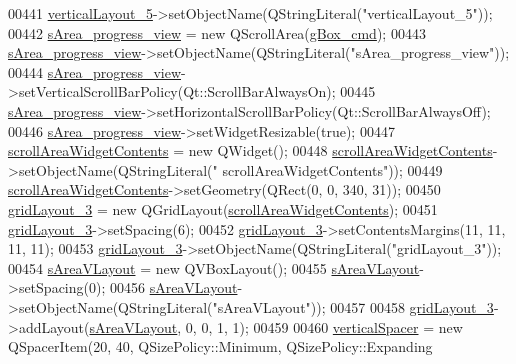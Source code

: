 \begin{DoxyCode}
00441         \hyperlink{a00080_afcc20a3d5058037a00cdc6122f231848}{verticalLayout\_5}->setObjectName(QStringLiteral(\textcolor{stringliteral}{"verticalLayout\_5"}));
00442         \hyperlink{a00080_ae4fe44aa026dd0e84e0f10cdcabca504}{sArea\_progress\_view} = \textcolor{keyword}{new} QScrollArea(\hyperlink{a00080_ad5c6667239e28060ba3b04ee0db97bac}{gBox\_cmd});
00443         \hyperlink{a00080_ae4fe44aa026dd0e84e0f10cdcabca504}{sArea\_progress\_view}->setObjectName(QStringLiteral(\textcolor{stringliteral}{"sArea\_progress\_view"}));
00444         \hyperlink{a00080_ae4fe44aa026dd0e84e0f10cdcabca504}{sArea\_progress\_view}->setVerticalScrollBarPolicy(Qt::ScrollBarAlwaysOn);
00445         \hyperlink{a00080_ae4fe44aa026dd0e84e0f10cdcabca504}{sArea\_progress\_view}->setHorizontalScrollBarPolicy(Qt::ScrollBarAlwaysOff);
00446         \hyperlink{a00080_ae4fe44aa026dd0e84e0f10cdcabca504}{sArea\_progress\_view}->setWidgetResizable(\textcolor{keyword}{true});
00447         \hyperlink{a00080_aa70fc2af9f9ea3b686db12823c5deb47}{scrollAreaWidgetContents} = \textcolor{keyword}{new} QWidget();
00448         \hyperlink{a00080_aa70fc2af9f9ea3b686db12823c5deb47}{scrollAreaWidgetContents}->setObjectName(QStringLiteral(\textcolor{stringliteral}{"
      scrollAreaWidgetContents"}));
00449         \hyperlink{a00080_aa70fc2af9f9ea3b686db12823c5deb47}{scrollAreaWidgetContents}->setGeometry(QRect(0, 0, 340, 31));
00450         \hyperlink{a00080_af42ea7d4c2e893181caad21e28166932}{gridLayout\_3} = \textcolor{keyword}{new} QGridLayout(\hyperlink{a00080_aa70fc2af9f9ea3b686db12823c5deb47}{scrollAreaWidgetContents});
00451         \hyperlink{a00080_af42ea7d4c2e893181caad21e28166932}{gridLayout\_3}->setSpacing(6);
00452         \hyperlink{a00080_af42ea7d4c2e893181caad21e28166932}{gridLayout\_3}->setContentsMargins(11, 11, 11, 11);
00453         \hyperlink{a00080_af42ea7d4c2e893181caad21e28166932}{gridLayout\_3}->setObjectName(QStringLiteral(\textcolor{stringliteral}{"gridLayout\_3"}));
00454         \hyperlink{a00080_a2bdce9ad313cd4ee575613f36cbc4678}{sAreaVLayout} = \textcolor{keyword}{new} QVBoxLayout();
00455         \hyperlink{a00080_a2bdce9ad313cd4ee575613f36cbc4678}{sAreaVLayout}->setSpacing(0);
00456         \hyperlink{a00080_a2bdce9ad313cd4ee575613f36cbc4678}{sAreaVLayout}->setObjectName(QStringLiteral(\textcolor{stringliteral}{"sAreaVLayout"}));
00457 
00458         \hyperlink{a00080_af42ea7d4c2e893181caad21e28166932}{gridLayout\_3}->addLayout(\hyperlink{a00080_a2bdce9ad313cd4ee575613f36cbc4678}{sAreaVLayout}, 0, 0, 1, 1);
00459 
00460         \hyperlink{a00080_a8384329c3663ff274e926a12024aab52}{verticalSpacer} = \textcolor{keyword}{new} QSpacerItem(20, 40, QSizePolicy::Minimum, QSizePolicy::Expanding

\end{DoxyCode}
